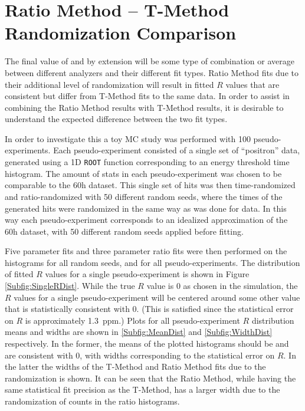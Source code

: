 
\thispagestyle{myheadings}

\graphicspath{{Body/Figures/Wa/T-Method-Comparison/}}

\chapter{Ratio Method -- T-Method Randomization Comparison}
\label{app:RTComparison}


The final value of \wa and by extension \amu will be some type of combination or average between different analyzers and their different fit types. Ratio Method fits due to their additional level of randomization will result in fitted $R$ values that are consistent but differ from T-Method fits to the same data. In order to assist in combining the Ratio Method results with T-Method results, it is desirable to understand the expected difference between the two fit types.


In order to investigate this a toy MC study was performed with 100 pseudo-experiments. Each pseudo-experiment consisted of a single set of ``positron'' data, generated using a 1D \texttt{ROOT} function corresponding to an energy threshold time histogram. The amount of stats in each pseudo-experiment was chosen to be comparable to the 60h dataset. This single set of hits was then time-randomized and ratio-randomized with 50 different random seeds, where the times of the generated hits were randomized in the same way as was done for data. In this way each pseudo-experiment corresponds to an idealized approximation of the 60h dataset, with 50 different random seeds applied before fitting.

Five parameter fits and three parameter ratio fits were then performed on the histograms for all random seeds, and for all pseudo-experiments. The distribution of fitted $R$ values for a single pseudo-experiment is shown in Figure \ref{Subfig:SingleRDist}. While the true $R$ value is 0 as chosen in the simulation, the $R$ values for a single pseudo-experiment will be centered around some other value that is statistically consistent with 0. (This is satisfied since the statistical error on $R$ is approximately \SI{1.3}{ppm}.) Plots for all pseudo-experiment $R$ distribution means and widths are shown in \ref{Subfig:MeanDist} and \ref{Subfig:WidthDist} respectively. In the former, the means of the plotted histograms should be and are consistent with 0, with widths corresponding to the statistical error on $R$. In the latter the widths of the T-Method and Ratio Method fits due to the randomization is shown. It can be seen that the Ratio Method, while having the same statistical fit precision as the T-Method, has a larger width due to the randomization of counts in the ratio histograms. 


